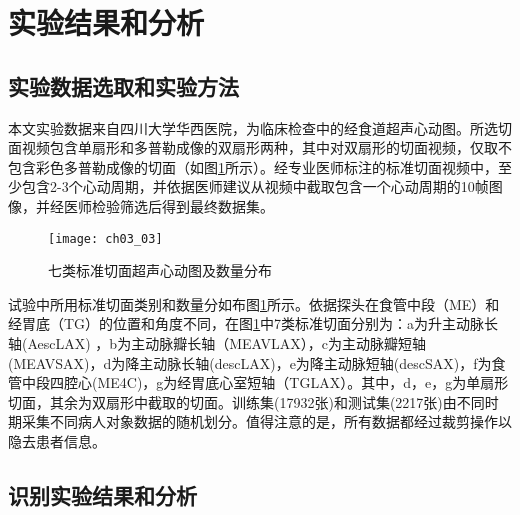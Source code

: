 \section{实验结果和分析}
\subsection{实验数据选取和实验方法}

本文实验数据来自四川大学华西医院，为临床检查中的经食道超声心动图。所选切面视频包含单扇形和多普勒成像的双扇形两种，其中对双扇形的切面视频，仅取不包含彩色多普勒成像的切面（如图\ref{fig:ch03_03}所示）。经专业医师标注的标准切面视频中，至少包含2-3个心动周期，并依据医师建议从视频中截取包含一个心动周期的10帧图像，并经医师检验筛选后得到最终数据集。
\begin{figure}[!htbp]
\centering
\texttt{[image: ch03\_03]}
\caption{七类标准切面超声心动图及数量分布}
\label{fig:ch03_03}
\end{figure}

试验中所用标准切面类别和数量分如布图\ref{fig:ch03_03}所示。依据探头在食管中段（ME）和经胃底（TG）的位置和角度不同，在图\ref{fig:ch03_03}中7类标准切面分别为：a为升主动脉长轴(AescLAX) ，b为主动脉瓣长轴（MEAVLAX），c为主动脉瓣短轴(MEAVSAX)，d为降主动脉长轴(descLAX)，e为降主动脉短轴(descSAX)，f为食管中段四腔心(ME4C)，g为经胃底心室短轴（TGLAX）。其中，d，e，g为单扇形切面，其余为双扇形中截取的切面。训练集(17932张)和测试集(2217张)由不同时期采集不同病人对象数据的随机划分。值得注意的是，所有数据都经过裁剪操作以隐去患者信息。
\subsection{识别实验结果和分析}

